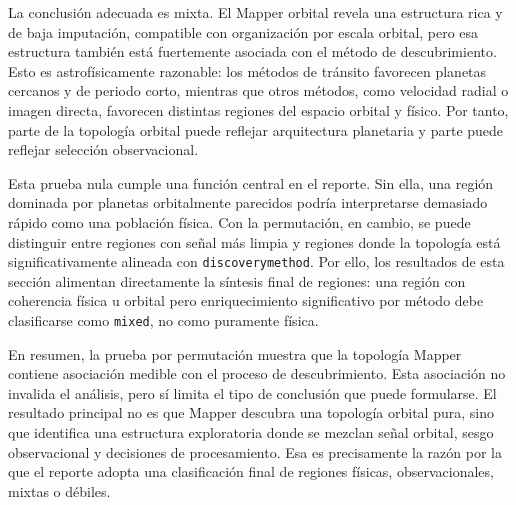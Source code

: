 La conclusión adecuada es mixta. El Mapper orbital revela una estructura rica y de baja imputación, compatible con organización por escala orbital, pero esa estructura también está fuertemente asociada con el método de descubrimiento. Esto es astrofísicamente razonable: los métodos de tránsito favorecen planetas cercanos y de periodo corto, mientras que otros métodos, como velocidad radial o imagen directa, favorecen distintas regiones del espacio orbital y físico. Por tanto, parte de la topología orbital puede reflejar arquitectura planetaria y parte puede reflejar selección observacional.

Esta prueba nula cumple una función central en el reporte. Sin ella, una región dominada por planetas orbitalmente parecidos podría interpretarse demasiado rápido como una población física. Con la permutación, en cambio, se puede distinguir entre regiones con señal más limpia y regiones donde la topología está significativamente alineada con \texttt{discoverymethod}. Por ello, los resultados de esta sección alimentan directamente la síntesis final de regiones: una región con coherencia física u orbital pero enriquecimiento significativo por método debe clasificarse como \texttt{mixed}, no como puramente física.

En resumen, la prueba por permutación muestra que la topología Mapper contiene asociación medible con el proceso de descubrimiento. Esta asociación no invalida el análisis, pero sí limita el tipo de conclusión que puede formularse. El resultado principal no es que Mapper descubra una topología orbital pura, sino que identifica una estructura exploratoria donde se mezclan señal orbital, sesgo observacional y decisiones de procesamiento. Esa es precisamente la razón por la que el reporte adopta una clasificación final de regiones físicas, observacionales, mixtas o débiles.




